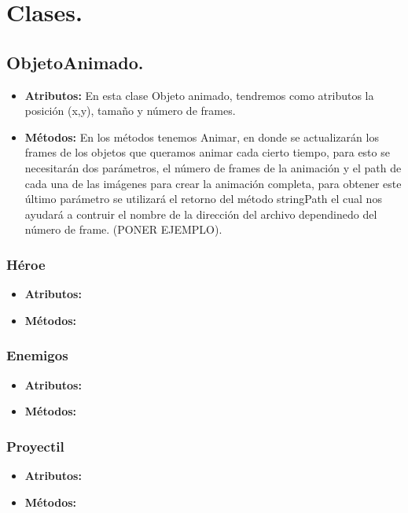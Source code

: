 \documentclass{article}
\begin{document}
\section{Clases.}
\subsection{ObjetoAnimado.}\label{objeto_animado}
\begin{itemize}
  \item \textbf{Atributos:} En esta clase Objeto animado, tendremos como atributos la posición (x,y), tamaño y número de frames.
  
  \item \textbf{Métodos:} En los métodos tenemos Animar, en donde se actualizarán los frames de los objetos que queramos animar cada cierto tiempo, para esto se necesitarán dos parámetros, el número de frames de la animación y el path de cada una de las imágenes para crear la animación completa, para obtener este último parámetro se utilizará el retorno del método stringPath el cual nos ayudará a contruir el nombre de la dirección del archivo dependinedo del número de frame. (PONER EJEMPLO).
\end{itemize}

    \subsubsection{Héroe}
    \begin{itemize}
        \item \textbf{Atributos:}
        \item \textbf{Métodos:}
    \end{itemize}
    
    \subsubsection{Enemigos}
    \begin{itemize}
        \item \textbf{Atributos:}
        \item \textbf{Métodos:}
    \end{itemize}
    
    \subsubsection{Proyectil}
    \begin{itemize}
        \item \textbf{Atributos:}
        \item \textbf{Métodos:}
    \end{itemize}
\end{document}
